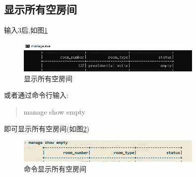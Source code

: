 \documentclass[UTF8]{ctexart}
\begin{document}
  \subsection{显示所有空房间}
    输入3后,如图\ref{fig:3}
    \begin{figure}[H]
      \centering
      \includegraphics[width=0.8\textwidth]{3}
      \caption{显示所有空房间}
      \label{fig:3}
    \end{figure}
    或者通过命令行输入:
    \begin{quote}
      manage show empty
    \end{quote}
    即可显示所有空房间(如图\ref{fig:c_3})
    \begin{figure}[H]
      \centering
      \includegraphics[width=0.8\textwidth]{c_3}
      \caption{命令显示所有空房间}
      \label{fig:c_3}
    \end{figure}
\end{document}
